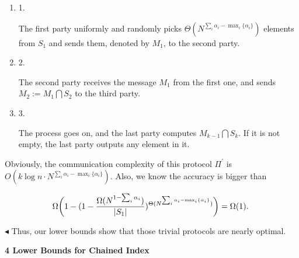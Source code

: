 \documentclass[10pt,a4paper]{article}
\begin{document}
\begin{enumerate}


\item[] 
1. 


The first party uniformly and randomly picks $\Theta(N^{\sum_{i}\alpha_{i}-\mathop{\max}_{i}\{\alpha_{i}\}})$ elements from $S_{1}$ and sends them, denoted by $M_{1}$, to the second party.\par





\item[] 
2. 


The second party receives the message $M_{1}$ from the first one, and sends $M_{2}:=M_{1}\bigcap S_{2}$ to the third party.\par





\item[] 
3. 


The process goes on, and the last party computes $M_{k-1}\bigcap S_{k}$. If it is not empty, the last party outputs any element in it.\par





\end{enumerate}




Obviously, the communication complexity of this protocol $\Pi^{\prime}$ is $O(k\log n\cdot N^{\sum_{i}\alpha_{i}-\mathop{\max}_{i}\{\alpha_{i}\}})$. Also, we know the accuracy is bigger than\par


\[\begin{gathered}
\Omega\bigg{(}1-(1-\frac{\Omega(N^{1-\sum_{i}\alpha_{i}})}{|S_{1}|})^{\Theta(N^{\sum_{i}\alpha_{i}-\mathop{\max}_{i}\{\alpha_{i}\}})}\bigg{)}=\Omega(1).\
\end{gathered}\]


$\blacktriangleleft$
Thus, our lower bounds show that those trivial protocols are nearly optimal.\par







\par\medskip\noindent\textbf{
4 Lower Bounds for Chained Index}\par
\end{document}
